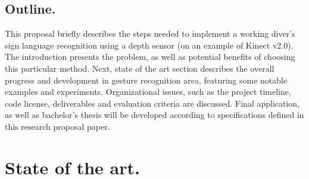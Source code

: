 \documentclass[a4paper,11pt,oneside]{article}
\begin{document}
  \subsection{Outline.}
  
  This proposal briefly describes the steps needed to implement a working diver's sign language recognition using a depth sensor (on an example of Kinect v2.0). The introduction presents the problem, as well as potential benefits of choosing this particular method. Next, state of the art section describes the overall progress and development in gesture recognition area, featuring some notable examples and experiments. Organizational issues, such as the project timeline, code license, deliverables and evaluation criteria are discussed. Final application, as well as bachelor's thesis will be developed according to specifications defined in this research proposal paper. 
  
  \section{State of the art.}
  
\end{document}
